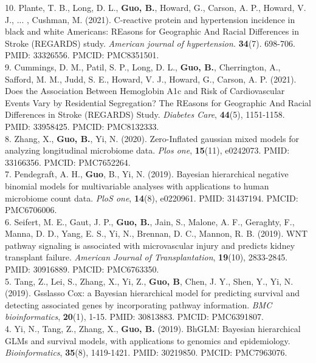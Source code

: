 10. Plante, T. B., Long, D. L., \textbf{Guo, B.}, Howard, G., Carson, A. P., Howard, V. J., ... , Cushman, M. (2021). C-reactive protein and hypertension incidence in black and white Americans: REasons for Geographic And Racial Differences in Stroke (REGARDS) study. \textit{American journal of hypertension.} {\bf 34}(7). 698-706. PMID: 33326556. PMCID: PMC8351501. \\

9. Cummings, D. M., Patil, S. P., Long, D. L., {\bf Guo, B.}, Cherrington, A., Safford, M. M., Judd, S. E., Howard, V. J., Howard, G., Carson, A. P. (2021). Does the Association Between Hemoglobin A1c and Risk of Cardiovascular Events Vary by Residential Segregation? The REasons for Geographic And Racial Differences in Stroke (REGARDS) Study. {\it Diabetes Care}, {\bf 44}(5), 1151-1158. PMID: 33958425. PMCID: PMC8132333.\\

8. Zhang, X., {\bf Guo, B.}, Yi, N. (2020). Zero-Inflated gaussian mixed models for analyzing longitudinal microbiome data. {\it Plos one}, {\bf 15}(11), e0242073. PMID: 33166356. PMCID: PMC7652264.\\

7. Pendegraft, A. H., {\bf Guo}, B., Yi, N. (2019). Bayesian hierarchical negative binomial models for multivariable analyses with applications to human microbiome count data. {\it PloS one}, {\bf 14}(8), e0220961. PMID: 31437194. PMCID: PMC6706006.\\

6. Seifert, M. E., Gaut, J. P., {\bf Guo, B.}, Jain, S., Malone, A. F., Geraghty, F., Manna, D. D., Yang, E. S., Yi, N., Brennan, D. C., Mannon, R. B. (2019). WNT pathway signaling is associated with microvascular injury and predicts kidney transplant failure. {\it American Journal of Transplantation}, {\bf 19}(10), 2833-2845. PMID: 30916889. PMCID: PMC6763350. \\

5. Tang, Z., Lei, S., Zhang, X., Yi, Z.,  {\bf Guo, B}, Chen, J. Y., Shen, Y.,  Yi, N. (2019). Gsslasso Cox: a Bayesian hierarchical model for predicting survival and detecting associated genes by incorporating pathway information. {\it BMC bioinformatics}, {\bf 20}(1), 1-15. PMID: 30813883. PMCID: PMC6391807.\\

4. Yi, N., Tang, Z., Zhang, X., {\bf Guo, B.} (2019). BhGLM: Bayesian hierarchical GLMs and survival models, with applications to genomics and epidemiology. {\it Bioinformatics}, {\bf 35}(8), 1419-1421. PMID: 30219850. PMCID: PMC7963076.\\

